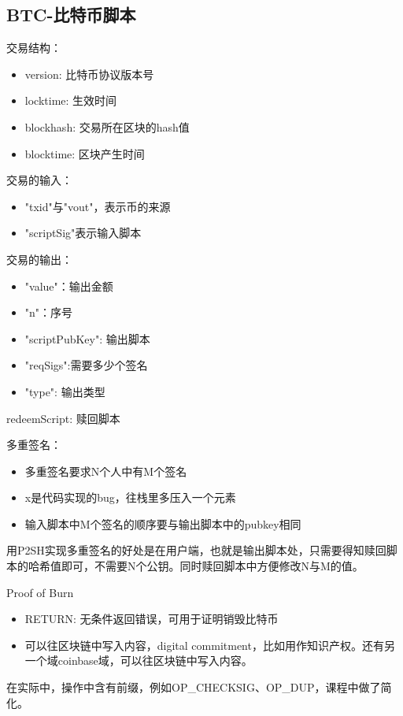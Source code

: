 \documentclass[10pt]{ctexart}
\begin{document}
\subsection{BTC-比特币脚本}
交易结构：
\begin{itemize}
    \item version: 比特币协议版本号
    \item locktime: 生效时间
    \item blockhash: 交易所在区块的hash值
    \item blocktime: 区块产生时间
\end{itemize}
交易的输入：
\begin{itemize}
    \item "txid"与"vout"，表示币的来源
    \item "scriptSig"表示输入脚本
\end{itemize}
交易的输出：
\begin{itemize}
    \item "value"：输出金额
    \item "n"：序号
    \item "scriptPubKey": 输出脚本
    \item "reqSigs":需要多少个签名
    \item "type": 输出类型
\end{itemize}
redeemScript: 赎回脚本

多重签名：
\begin{itemize}
    \item 多重签名要求N个人中有M个签名
    \item x是代码实现的bug，往栈里多压入一个元素
    \item 输入脚本中M个签名的顺序要与输出脚本中的pubkey相同
\end{itemize}

用P2SH实现多重签名的好处是在用户端，也就是输出脚本处，只需要得知赎回脚本的哈希值即可，不需要N个公钥。同时赎回脚本中方便修改N与M的值。

Proof of Burn
\begin{itemize}
    \item RETURN: 无条件返回错误，可用于证明销毁比特币
    \item 可以往区块链中写入内容，digital commitment，比如用作知识产权。还有另一个域coinbase域，可以往区块链中写入内容。
\end{itemize}

在实际中，操作中含有前缀，例如OP\_CHECKSIG、OP\_DUP，课程中做了简化。

  
\end{document}
